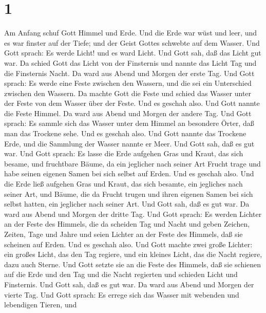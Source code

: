 \hypertarget{section}{%
\section{1}\label{section}}

 Am Anfang schuf Gott Himmel und Erde.  Und die
Erde war wüst und leer, und es war finster auf der Tiefe; und der Geist
Gottes schwebte auf dem Wasser.  Und Gott sprach: Es werde
Licht! und es ward Licht.  Und Gott sah, daß das Licht gut
war. Da schied Gott das Licht von der Finsternis  und nannte
das Licht Tag und die Finsternis Nacht. Da ward aus Abend und Morgen der
erste Tag.  Und Gott sprach: Es werde eine Feste zwischen
den Wassern, und die sei ein Unterschied zwischen den Wassern.
 Da machte Gott die Feste und schied das Wasser unter der
Feste von dem Wasser über der Feste. Und es geschah also. 
Und Gott nannte die Feste Himmel. Da ward aus Abend und Morgen der
andere Tag.  Und Gott sprach: Es sammle sich das Wasser
unter dem Himmel an besondere Örter, daß man das Trockene sehe. Und es
geschah also.  Und Gott nannte das Trockene Erde, und die
Sammlung der Wasser nannte er Meer. Und Gott sah, daß es gut war.
 Und Gott sprach: Es lasse die Erde aufgehen Gras und
Kraut, das sich besame, und fruchtbare Bäume, da ein jeglicher nach
seiner Art Frucht trage und habe seinen eigenen Samen bei sich selbst
auf Erden. Und es geschah also.  Und die Erde ließ aufgehen
Gras und Kraut, das sich besamte, ein jegliches nach seiner Art, und
Bäume, die da Frucht trugen und ihren eigenen Samen bei sich selbst
hatten, ein jeglicher nach seiner Art. Und Gott sah, daß es gut war.
 Da ward aus Abend und Morgen der dritte Tag. 
Und Gott sprach: Es werden Lichter an der Feste des Himmels, die da
scheiden Tag und Nacht und geben Zeichen, Zeiten, Tage und Jahre
 und seien Lichter an der Feste des Himmels, daß sie
scheinen auf Erden. Und es geschah also.  Und Gott machte
zwei große Lichter: ein großes Licht, das den Tag regiere, und ein
kleines Licht, das die Nacht regiere, dazu auch Sterne. 
Und Gott setzte sie an die Feste des Himmels, daß sie schienen auf die
Erde  und den Tag und die Nacht regierten und schieden
Licht und Finsternis. Und Gott sah, daß es gut war.  Da
ward aus Abend und Morgen der vierte Tag.  Und Gott sprach:
Es errege sich das Wasser mit webenden und lebendigen Tieren, und
